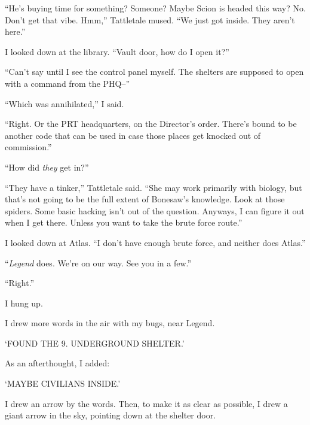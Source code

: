 ``He's buying time for something?  Someone?  Maybe Scion is headed this way?  No.  Don't get that vibe.  Hmm,'' Tattletale mused.  ``We just got inside.  They aren't here.''



I looked down at the library.  ``Vault door, how do I open it?''



``Can't say until I see the control panel myself.  The shelters are supposed to open with a command from the PHQ--''



``Which was annihilated,'' I said.



``Right.  Or the PRT headquarters, on the Director's order.  There's bound to be another code that can be used in case those places get knocked out of commission.''



``How did \emph{they} get in?''



``They have a tinker,'' Tattletale said.  ``She may work primarily with biology, but that's not going to be the full extent of Bonesaw's knowledge.  Look at those spiders.  Some basic hacking isn't out of the question.  Anyways, I can figure it out when I get there.  Unless you want to take the brute force route.''



I looked down at Atlas.  ``I don't have enough brute force, and neither does Atlas.''



``\emph{Legend} does.  We're on our way.  See you in a few.''



``Right.''



I hung up.



I drew more words in the air with my bugs, near Legend.



`FOUND THE 9.  UNDERGROUND SHELTER.'



As an afterthought, I added:



`MAYBE CIVILIANS INSIDE.'



I drew an arrow by the words.  Then, to make it as clear as possible, I drew a giant arrow in the sky, pointing down at the shelter door.



